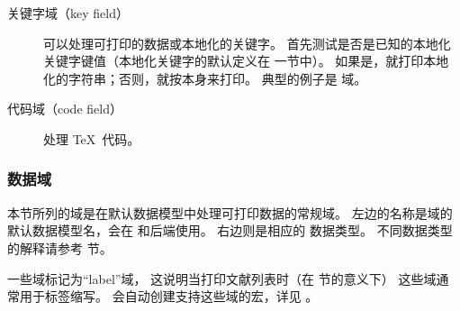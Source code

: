 \begin{description}
\begin{description}
\item[关键字域（key field）] 可以处理可打印的数据或本地化的关键字。
首先测试是否是已知的本地化关键字键值（本地化关键字的默认定义在  一节中）。
如果是，就打印本地化的字符串；否则，就按本身来打印。
典型的例子是  域。


\item[代码域（code field）] 处理 \TeX\ 代码。

\end{description}
\end{description}

\subsubsection{数据域}%
\label{bib:fld:dat}


本节所列的域是在默认数据模型中处理可打印数据的常规域。
左边的名称是域的默认数据模型名，会在 \biblatex 和后端使用。
右边则是相应的 \biblatex 数据类型。
不同数据类型的解释请参考  节。


一些域标记为“label”域，
这说明当打印文献列表时（在 节的意义下）
这些域通常用于标签缩写。
\biblatex 会自动创建支持这些域的宏，详见 。

